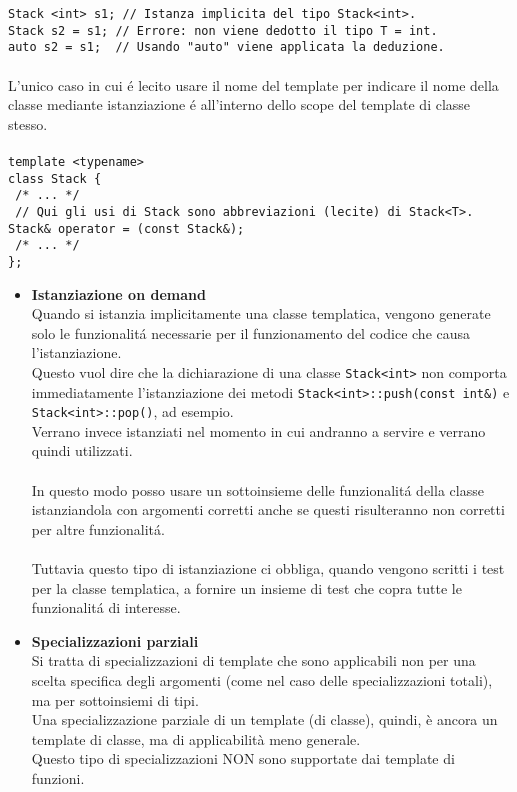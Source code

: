 \documentclass{article}
\newcommand\tab[1][1cm]{\hspace*{#1}}
\begin{document}
\texttt{Stack <int> s1; \textcolor{grigio}{// Istanza implicita del tipo Stack<int>.}\\Stack s2 = s1; \textcolor{grigio}{// Errore: non viene dedotto il tipo T = int. }\\ auto s2 = s1; \textcolor{grigio}{ // Usando "auto" viene applicata la deduzione. }} \\ \\
L'unico caso in cui \'e lecito usare il nome del template per indicare il nome della classe mediante istanziazione \'e all'interno dello scope del template di classe stesso. \\ \\
\texttt{template <typename>\\ class Stack \{ \\ \tab \textcolor{grigio}{ /* ... */ }\\ \tab \textcolor{grigio}{ // Qui gli usi di Stack sono abbreviazioni (lecite) di Stack<T>.} \\ \tab Stack\& operator = (const Stack\&); \\ \tab \textcolor{grigio}{ /* ... */ } \\ \};} \\
\begin{itemize}
\item \textbf{\textcolor{blu}{Istanziazione on demand}}\\ Quando si istanzia implicitamente una classe templatica, vengono generate solo le funzionalit\'a necessarie per il funzionamento del codice che causa l'istanziazione.\\Questo vuol dire che la dichiarazione di una classe \texttt{Stack<int>} non comporta immediatamente l'istanziazione dei metodi \texttt{Stack<int>::push(const int\&)} e \texttt{Stack<int>::pop()}, ad esempio.\\Verrano invece istanziati nel momento in cui andranno a servire e verrano quindi utilizzati.\\ \\
In questo modo posso usare un sottoinsieme delle funzionalit\'a della classe istanziandola con argomenti corretti anche se questi risulteranno non corretti per altre funzionalit\'a. \\ \\Tuttavia questo tipo di istanziazione ci obbliga, quando vengono scritti i test per la classe templatica, a fornire un insieme di test che copra tutte le funzionalit\'a di interesse. \\
\item \textbf{\textcolor{blu}{Specializzazioni parziali}}\\ Si tratta di specializzazioni di template che sono applicabili non per una scelta specifica degli argomenti (come nel caso delle specializzazioni totali), ma per sottoinsiemi di tipi. \\ Una specializzazione parziale di un template (di classe), quindi, è ancora un template di classe, ma di applicabilità meno generale. \\Questo tipo di specializzazioni NON sono supportate dai template di funzioni. \\
\end{itemize}
\end{document}
